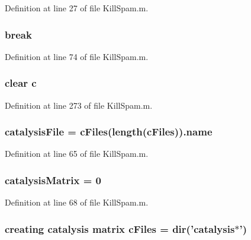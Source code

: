 Definition at line 27 of file Kill\-Spam.\-m.

\hypertarget{a00023_a91cf6fbebedd86150a36e5ac3d5d3bfc}{
\subsubsection[{break}]{\setlength{\rightskip}{0pt plus 5cm}break}}\label{a00023_a91cf6fbebedd86150a36e5ac3d5d3bfc}


Definition at line 74 of file Kill\-Spam.\-m.

\hypertarget{a00023_a8e54ca14679a1ce9245a3b7d55d95570}{
\subsubsection[{c}]{\setlength{\rightskip}{0pt plus 5cm}clear c}}\label{a00023_a8e54ca14679a1ce9245a3b7d55d95570}


Definition at line 273 of file Kill\-Spam.\-m.

\hypertarget{a00023_a33e70cf5b45cb59005b82d30202f0b69}{
\subsubsection[{catalysis\-File}]{\setlength{\rightskip}{0pt plus 5cm}catalysis\-File = {\bf c\-Files}(length({\bf c\-Files})).{\bf name}}}\label{a00023_a33e70cf5b45cb59005b82d30202f0b69}


Definition at line 65 of file Kill\-Spam.\-m.

\hypertarget{a00023_a0810027f58d6be965e44b7b84c44ace8}{
\subsubsection[{catalysis\-Matrix}]{\setlength{\rightskip}{0pt plus 5cm}catalysis\-Matrix = 0}}\label{a00023_a0810027f58d6be965e44b7b84c44ace8}


Definition at line 68 of file Kill\-Spam.\-m.

\hypertarget{a00023_a9eab57ccb42a39c704f47dc30e4f4515}{
\subsubsection[{c\-Files}]{\setlength{\rightskip}{0pt plus 5cm}creating {\bf catalysis} matrix c\-Files = {\bf dir}('{\bf catalysis}$\ast$')}}\label{a00023_a9eab57ccb42a39c704f47dc30e4f4515}


